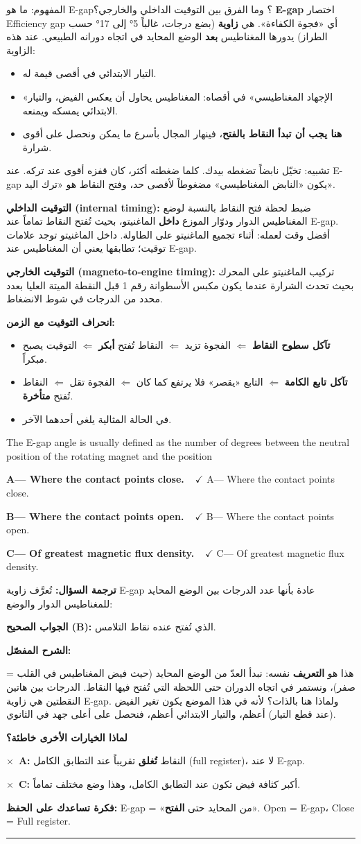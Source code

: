 \documentclass[11pt,a4paper]{article}
\newcommand{\en}[1]{\textenglish{#1}}
\newcommand{\correctletter}{}
\newcommand{\opt}[2]{%
  \ifdefstring{\correctletter}{#1}%
    {\textcolor{ansgreen}{\textbf{#1— #2\ \ $\checkmark$}}}%
    {#1— #2}\par}
\newcommand{\Q}[6]{%
  \renewcommand{\correctletter}{#6}%
  \par\bigskip
  \phantomsection\label{q#1}%
  \begin{tcolorbox}[enhanced,breakable,colback=qback,colframe=qframe,
      arc=2mm,boxrule=0.8pt,fonttitle=\bfseries,
      title={\en{Question #1}}]
    \begin{english}
      #2\par\smallskip
      \opt{A}{#3}\opt{B}{#4}\opt{C}{#5}
    \end{english}
  \end{tcolorbox}}
\newcommand{\tr}[1]{\textbf{\textcolor{qframe}{ترجمة السؤال:}} #1\par}
\newcommand{\ans}[2]{%
  \begin{tcolorbox}[colback=ansback,colframe=ansgreen,boxrule=0.6pt,arc=1.5mm,
      left=4pt,right=4pt,top=2pt,bottom=2pt]
    \textbf{\textcolor{ansgreen}{الجواب الصحيح (\en{#1}):}} #2
  \end{tcolorbox}}
\newcommand{\sharh}[1]{\textbf{\textcolor{conceptc}{الشرح المفصّل:}}\par #1\par}
\newcommand{\nohead}{\textbf{\textcolor{wrongc}{لماذا الخيارات الأخرى خاطئة؟}}\par}
\newcommand{\no}[2]{\hspace*{1em}\textcolor{wrongc}{$\times$}\ \textbf{\en{#1}:} #2\par}
\newcommand{\tip}[1]{%
  \begin{tcolorbox}[colback=tipback,colframe=tipframe,boxrule=0.5pt,arc=1.5mm,
      left=4pt,right=4pt,top=2pt,bottom=2pt]
    \textbf{فكرة تساعدك على الحفظ:} #1
  \end{tcolorbox}}
\newcommand{\qsep}{\par\medskip\noindent\textcolor{qframe!40}{\rule{\linewidth}{0.4pt}}\par}
\begin{document}
\begin{concept}{المفهوم: ما هو \en{E-gap}؟ وما الفرق بين التوقيت الداخلي والخارجي؟}
\textbf{\en{E-gap}} اختصار \en{Efficiency gap} أي «فجوة الكفاءة». هي \textbf{زاوية} (بضع درجات، غالباً 5° إلى 17° حسب الطراز) يدورها المغناطيس \textbf{بعد} الوضع المحايد في اتجاه دورانه الطبيعي. عند هذه الزاوية:
\begin{itemize}
  \item التيار الابتدائي في أقصى قيمة له.
  \item «الإجهاد المغناطيسي» في أقصاه: المغناطيس يحاول أن يعكس الفيض، والتيار الابتدائي يمسكه ويمنعه.
  \item \textbf{هنا يجب أن تبدأ النقاط بالفتح}، فينهار المجال بأسرع ما يمكن ونحصل على أقوى شرارة.
\end{itemize}
تشبيه: تخيّل نابضاً تضغطه بيدك. كلما ضغطته أكثر، كان قفزه أقوى عند تركه. عند \en{E-gap} يكون «النابض المغناطيسي» مضغوطاً لأقصى حد، وفتح النقاط هو «ترك اليد».

\textbf{التوقيت الداخلي (\en{internal timing}):} ضبط لحظة فتح النقاط بالنسبة لوضع المغناطيس الدوار ودوّار الموزع \textbf{داخل} الماغنيتو، بحيث تُفتح النقاط تماماً عند \en{E-gap}. أفضل وقت لعمله: أثناء تجميع الماغنيتو على الطاولة. داخل الماغنيتو توجد علامات توقيت؛ تطابقها يعني أن المغناطيس عند \en{E-gap}.

\textbf{التوقيت الخارجي (\en{magneto-to-engine timing}):} تركيب الماغنيتو على المحرك بحيث تحدث الشرارة عندما يكون مكبس الأسطوانة رقم 1 قبل النقطة الميتة العليا بعدد محدد من الدرجات في شوط الانضغاط.

\textbf{انحراف التوقيت مع الزمن:}
\begin{itemize}
  \item \textbf{تآكل سطوح النقاط} $\Leftarrow$ الفجوة تزيد $\Leftarrow$ النقاط تُفتح \textbf{أبكر} $\Leftarrow$ التوقيت يصبح مبكراً.
  \item \textbf{تآكل تابع الكامة} $\Leftarrow$ التابع «يقصر» فلا يرتفع كما كان $\Leftarrow$ الفجوة تقل $\Leftarrow$ النقاط تُفتح \textbf{متأخرة}.
  \item في الحالة المثالية يلغي أحدهما الآخر.
\end{itemize}
\end{concept}

\Q{8505}{The E-gap angle is usually defined as the number of degrees between the neutral position of the rotating magnet and the position}
{Where the contact points close.}
{Where the contact points open.}
{Of greatest magnetic flux density.}{B}
\tr{تُعرَّف زاوية \en{E-gap} عادة بأنها عدد الدرجات بين الوضع المحايد للمغناطيس الدوار والوضع:}
\ans{B}{الذي تُفتح عنده نقاط التلامس.}
\sharh{هذا هو \textbf{التعريف} نفسه: نبدأ العدّ من الوضع المحايد (حيث فيض المغناطيس في القلب = صفر)، ونستمر في اتجاه الدوران حتى اللحظة التي تُفتح فيها النقاط. الدرجات بين هاتين النقطتين هي زاوية \en{E-gap}. ولماذا هنا بالذات؟ لأنه في هذا الموضع يكون تغير الفيض (عند قطع التيار) أعظم، والتيار الابتدائي أعظم، فنحصل على أعلى جهد في الثانوي.}
\nohead
\no{A}{النقاط \textbf{تُغلق} تقريباً عند التطابق الكامل (\en{full register})، لا عند \en{E-gap}.}
\no{C}{أكبر كثافة فيض تكون عند التطابق الكامل، وهذا وضع مختلف تماماً.}
\tip{\en{E-gap} = «من المحايد حتى \textbf{الفتح}». \en{Open} = \en{E-gap}، \en{Close} = \en{Full register}.}
\qsep
\end{document}
